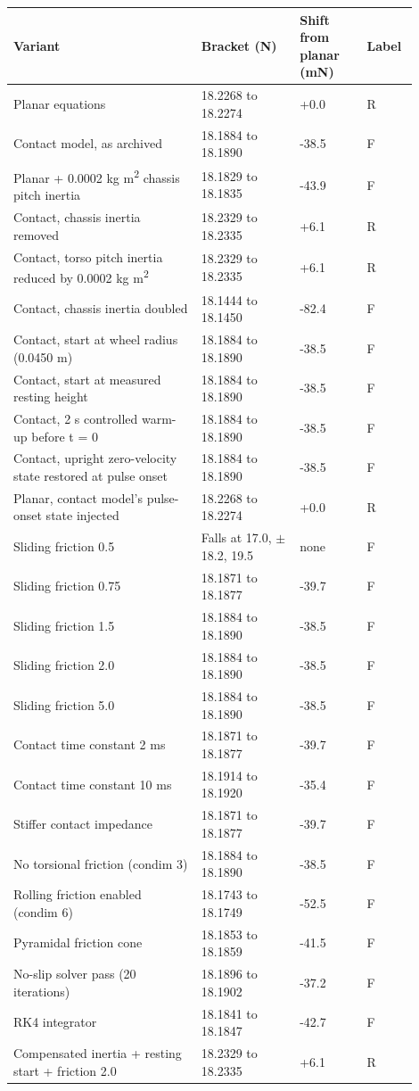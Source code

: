 \documentclass[11pt,a4paper]{article}
\begin{document}
\begin{longtable}{p{0.423\linewidth}p{0.225\linewidth}p{0.153\linewidth}p{0.099\linewidth}}
\toprule
Variant & Bracket (N) & Shift from planar (mN) & Label \\ \midrule \endhead
Planar equations & 18.2268 to 18.2274 & +0.0 & R \\
Contact model, as archived & 18.1884 to 18.1890 & -38.5 & F \\
Planar + 0.0002 kg m\textsuperscript{2} chassis pitch inertia & 18.1829 to 18.1835 & -43.9 & F \\
Contact, chassis inertia removed & 18.2329 to 18.2335 & +6.1 & R \\
Contact, torso pitch inertia reduced by 0.0002 kg m\textsuperscript{2} & 18.2329 to 18.2335 & +6.1 & R \\
Contact, chassis inertia doubled & 18.1444 to 18.1450 & -82.4 & F \\
Contact, start at wheel radius (0.0450 m) & 18.1884 to 18.1890 & -38.5 & F \\
Contact, start at measured resting height & 18.1884 to 18.1890 & -38.5 & F \\
Contact, 2 s controlled warm-up before t = 0 & 18.1884 to 18.1890 & -38.5 & F \\
Contact, upright zero-velocity state restored at pulse onset & 18.1884 to 18.1890 & -38.5 & F \\
Planar, contact model's pulse-onset state injected & 18.2268 to 18.2274 & +0.0 & R \\
Sliding friction 0.5 & Falls at 17.0, \ensuremath{\pm}18.2, 19.5 & none & F \\
Sliding friction 0.75 & 18.1871 to 18.1877 & -39.7 & F \\
Sliding friction 1.5 & 18.1884 to 18.1890 & -38.5 & F \\
Sliding friction 2.0 & 18.1884 to 18.1890 & -38.5 & F \\
Sliding friction 5.0 & 18.1884 to 18.1890 & -38.5 & F \\
Contact time constant 2 ms & 18.1871 to 18.1877 & -39.7 & F \\
Contact time constant 10 ms & 18.1914 to 18.1920 & -35.4 & F \\
Stiffer contact impedance & 18.1871 to 18.1877 & -39.7 & F \\
No torsional friction (condim 3) & 18.1884 to 18.1890 & -38.5 & F \\
Rolling friction enabled (condim 6) & 18.1743 to 18.1749 & -52.5 & F \\
Pyramidal friction cone & 18.1853 to 18.1859 & -41.5 & F \\
No-slip solver pass (20 iterations) & 18.1896 to 18.1902 & -37.2 & F \\
RK4 integrator & 18.1841 to 18.1847 & -42.7 & F \\
Compensated inertia + resting start + friction 2.0 & 18.2329 to 18.2335 & +6.1 & R \\
\bottomrule
\end{longtable}
\end{document}
